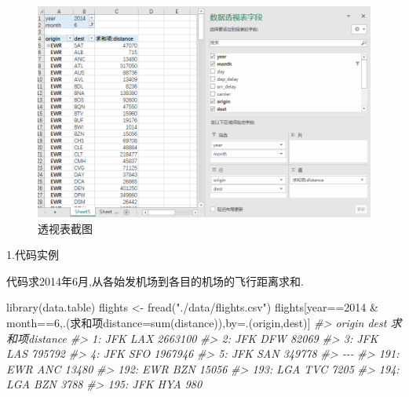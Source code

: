 \documentclass[
]{book}
\newenvironment{Shaded}{\begin{snugshade}}{\end{snugshade}}
\newcommand{\AttributeTok}[1]{\textcolor[rgb]{0.77,0.63,0.00}{#1}}
\newcommand{\CommentTok}[1]{\textcolor[rgb]{0.56,0.35,0.01}{\textit{#1}}}
\newcommand{\DecValTok}[1]{\textcolor[rgb]{0.00,0.00,0.81}{#1}}
\newcommand{\FunctionTok}[1]{\textcolor[rgb]{0.00,0.00,0.00}{#1}}
\newcommand{\NormalTok}[1]{#1}
\newcommand{\OtherTok}[1]{\textcolor[rgb]{0.56,0.35,0.01}{#1}}
\newcommand{\SpecialCharTok}[1]{\textcolor[rgb]{0.00,0.00,0.00}{#1}}
\newcommand{\StringTok}[1]{\textcolor[rgb]{0.31,0.60,0.02}{#1}}
\begin{document}
\begin{figure}
\centering
\includegraphics{./picture/data-table/01picture.png}
\caption{透视表截图}
\end{figure}

1.代码实例

代码求2014年6月,从各始发机场到各目的机场的飞行距离求和.

\begin{Shaded}
\begin{Highlighting}[]
\FunctionTok{library}\NormalTok{(data.table)}
\NormalTok{flights }\OtherTok{\textless{}{-}} \FunctionTok{fread}\NormalTok{(}\StringTok{"./data/flights.csv"}\NormalTok{)}
\NormalTok{flights[year}\SpecialCharTok{==}\DecValTok{2014} \SpecialCharTok{\&}\NormalTok{ month}\SpecialCharTok{==}\DecValTok{6}\NormalTok{,.(求和项}\AttributeTok{distance=}\FunctionTok{sum}\NormalTok{(distance)),by}\OtherTok{=}\NormalTok{.(origin,dest)]}
\CommentTok{\#\textgreater{}      origin dest 求和项distance}
\CommentTok{\#\textgreater{}   1:    JFK  LAX        2663100}
\CommentTok{\#\textgreater{}   2:    JFK  DFW          82069}
\CommentTok{\#\textgreater{}   3:    JFK  LAS         795792}
\CommentTok{\#\textgreater{}   4:    JFK  SFO        1967946}
\CommentTok{\#\textgreater{}   5:    JFK  SAN         349778}
\CommentTok{\#\textgreater{}  {-}{-}{-}                           }
\CommentTok{\#\textgreater{} 191:    EWR  ANC          13480}
\CommentTok{\#\textgreater{} 192:    EWR  BZN          15056}
\CommentTok{\#\textgreater{} 193:    LGA  TVC           7205}
\CommentTok{\#\textgreater{} 194:    LGA  BZN           3788}
\CommentTok{\#\textgreater{} 195:    JFK  HYA            980}
\end{Highlighting}
\end{Shaded}
\end{document}
